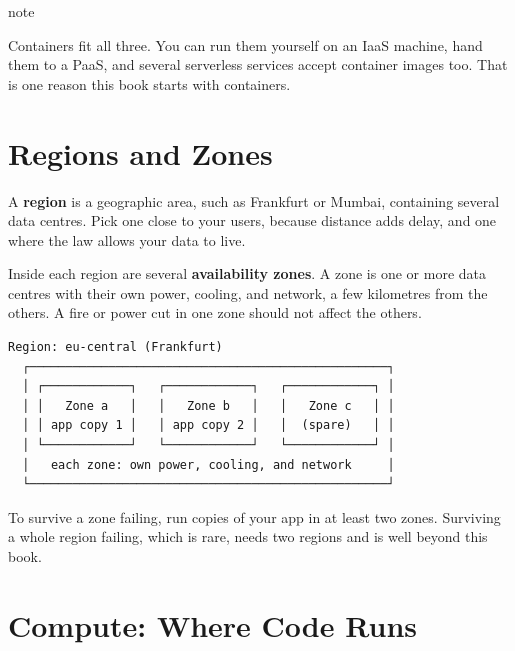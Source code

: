 \begin{callout}{note}

Containers fit all three. You can run them yourself on an IaaS machine, hand them to a PaaS, and several serverless services accept container images too. That is one reason this book starts with containers.

\end{callout}

\section{Regions and Zones}\label{03-the-cloud-renting-computers-by-the-minute:regions-and-zones}

A \textbf{region} is a geographic area, such as Frankfurt or Mumbai, containing several data centres. Pick one close to your users, because distance adds delay, and one where the law allows your data to live.

Inside each region are several \textbf{availability zones}. A zone is one or more data centres with their own power, cooling, and network, a few kilometres from the others. A fire or power cut in one zone should not affect the others.

\begin{codeblock}
\begin{Verbatim}[breaklines=false, fontsize=\fontsize{8.8}{8.68}\selectfont, fontfamily=diagrammono, formatcom=\diagramlines]
  Region: eu-central (Frankfurt)
  ┌──────────────────────────────────────────────────┐
  │ ┌────────────┐   ┌────────────┐   ┌────────────┐ │
  │ │   Zone a   │   │   Zone b   │   │   Zone c   │ │
  │ │ app copy 1 │   │ app copy 2 │   │  (spare)   │ │
  │ └────────────┘   └────────────┘   └────────────┘ │
  │   each zone: own power, cooling, and network     │
  └──────────────────────────────────────────────────┘
\end{Verbatim}
\end{codeblock}

To survive a zone failing, run copies of your app in at least two zones. Surviving a whole region failing, which is rare, needs two regions and is well beyond this book.

\section{Compute: Where Code Runs}\label{03-the-cloud-renting-computers-by-the-minute:compute-where-code-runs}

